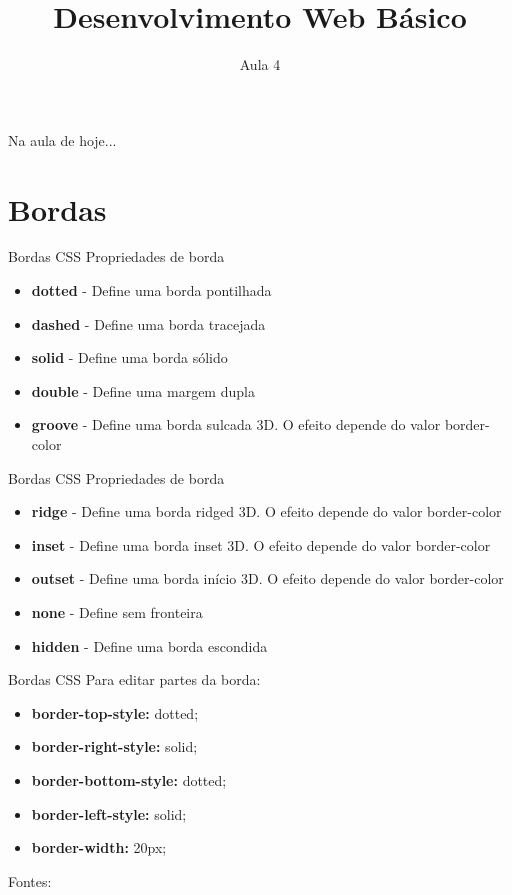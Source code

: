 \documentclass{beamer}
\date{}
\title{Desenvolvimento Web Básico}
\subtitle{Aula 4}
\begin{document}
\frame{
 \titlepage
}

\begin{frame}{Na aula de hoje...} 
\tableofcontents 
\end{frame}

\section{Bordas}
\begin{frame}{Bordas CSS}
	Propriedades de borda
 \begin{itemize}
  \item \textbf{dotted} - Define uma borda pontilhada
	\item \textbf{dashed} - Define uma borda tracejada
	\item \textbf{solid} - Define uma borda sólido
	\item \textbf{double} - Define uma margem dupla
  \item \textbf{groove} - Define uma borda sulcada 3D. O efeito depende do valor border-color
 \end{itemize}

\end{frame}
\begin{frame}{Bordas CSS}
	Propriedades de borda
 \begin{itemize}
	\item \textbf{ridge} - Define uma borda ridged 3D. O efeito depende do valor border-color
	\item \textbf{inset} - Define uma borda inset 3D. O efeito depende do valor border-color
	\item \textbf{outset} - Define uma borda início 3D. O efeito depende do valor border-color
	\item \textbf{none} - Define sem fronteira
	\item \textbf{hidden} - Define uma borda escondida
 \end{itemize}
\end{frame}
\begin{frame}{Bordas CSS}
Para editar partes da borda:
\begin{itemize}
	\item \textbf{border-top-style:} dotted;
  \item \textbf{border-right-style:} solid;
  \item \textbf{border-bottom-style:} dotted;
  \item \textbf{border-left-style:} solid;
  \item \textbf{border-width:} 20px;
 \end{itemize}
 \tiny Fontes: \cite{wschool2018html, purewal2014learning}
\end{frame}
\end{document}

